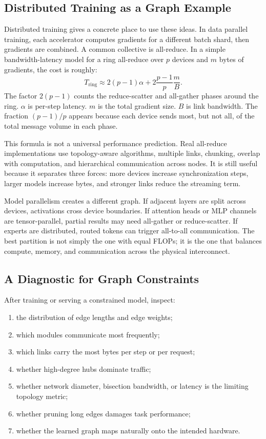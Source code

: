 \subsection{Distributed Training as a Graph Example}

Distributed training gives a concrete place to use these ideas. In data parallel training, each accelerator computes gradients for a different batch shard, then gradients are combined. A common collective is all-reduce. In a simple bandwidth-latency model for a ring all-reduce over \(p\) devices and \(m\) bytes of gradients, the cost is roughly:
\[
  T_{\text{ring}}
  \approx
  2(p-1)\alpha
  +
  2\frac{p-1}{p}\frac{m}{B}.
\]
The factor \(2(p-1)\) counts the reduce-scatter and all-gather phases around the ring. \(\alpha\) is per-step latency. \(m\) is the total gradient size. \(B\) is link bandwidth. The fraction \((p-1)/p\) appears because each device sends most, but not all, of the total message volume in each phase.

This formula is not a universal performance prediction. Real all-reduce implementations use topology-aware algorithms, multiple links, chunking, overlap with computation, and hierarchical communication across nodes. It is still useful because it separates three forces: more devices increase synchronization steps, larger models increase bytes, and stronger links reduce the streaming term.

Model parallelism creates a different graph. If adjacent layers are split across devices, activations cross device boundaries. If attention heads or MLP channels are tensor-parallel, partial results may need all-gather or reduce-scatter. If experts are distributed, routed tokens can trigger all-to-all communication. The best partition is not simply the one with equal FLOPs; it is the one that balances compute, memory, and communication across the physical interconnect.

\subsection{A Diagnostic for Graph Constraints}

After training or serving a constrained model, inspect:
\begin{enumerate}
  \item the distribution of edge lengths and edge weights;
  \item which modules communicate most frequently;
  \item which links carry the most bytes per step or per request;
  \item whether high-degree hubs dominate traffic;
  \item whether network diameter, bisection bandwidth, or latency is the limiting topology metric;
  \item whether pruning long edges damages task performance;
  \item whether the learned graph maps naturally onto the intended hardware.
\end{enumerate}

